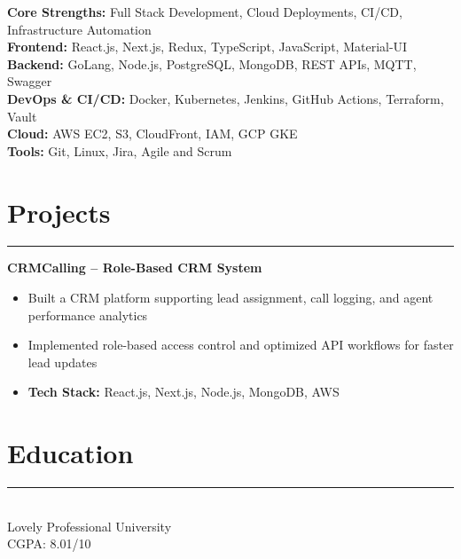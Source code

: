 \documentclass[a4paper,10pt]{article}
\begin{document}
\noindent\textbf{Core Strengths:} Full Stack Development, Cloud Deployments, CI/CD, Infrastructure Automation \\
\textbf{Frontend:} React.js, Next.js, Redux, TypeScript, JavaScript, Material-UI \\
\textbf{Backend:} GoLang, Node.js, PostgreSQL, MongoDB, REST APIs, MQTT, Swagger \\
\textbf{DevOps \& CI/CD:} Docker, Kubernetes, Jenkins, GitHub Actions, Terraform, Vault \\
\textbf{Cloud:} AWS EC2, S3, CloudFront, IAM, GCP GKE \\
\textbf{Tools:} Git, Linux, Jira, Agile and Scrum

\section*{Projects}
\vspace{-\baselineskip}
\noindent\rule{\textwidth}{0.1mm}


\vspace{0.3em}
\noindent \textbf{ CRMCalling – Role-Based CRM System }
\vspace{-0.6em}

\begin{itemize}[left=1em, label=\textbullet, itemsep=0.10em]

    \item Built a CRM platform supporting lead assignment, call logging, and agent performance analytics

    \item Implemented role-based access control and optimized API workflows for faster lead updates


    \item \textbf{Tech Stack:} React.js, Next.js, Node.js, MongoDB, AWS

\end{itemize}


\section*{Education}
\vspace{-\baselineskip}
\noindent\rule{\textwidth}{0.1mm}

\noindent
{}\\
Lovely Professional University \\
CGPA: 8.01/10
\end{document}

